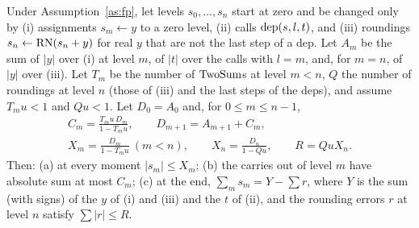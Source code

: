 \begin{lemma}\label{lem:l}
Under Assumption~\ref{as:fp}, let levels $s_0, \dots, s_n$ start at zero and be changed only by (i) assignments $s_m \gets y$ to
a zero level, (ii) calls $\mathrm{dep}(s, l, t)$, and (iii) roundings $s_n \gets \mathrm{RN}(s_n + y)$ for real $y$ that are not the
last step of a dep. Let $A_m$ be the sum of $|y|$ over (i) at level $m$, of $|t|$ over the calls with $l = m$, and, for
$m = n$, of $|y|$ over (iii). Let $T_m$ be the number of $\mathrm{TwoSum}$s at level $m < n$, $Q$ the number of roundings at
level $n$ (those of (iii) and the last steps of the deps), and assume $T_m u < 1$ and $Qu < 1$. Let $D_0 = A_0$ and, for
$0 \le m \le n-1$,
\begin{gather*}
C_m = \frac{T_m u\,D_m}{1 - T_m u}, \qquad D_{m+1} = A_{m+1} + C_m, \\
X_m = \frac{D_m}{1 - T_m u}\ (m < n), \qquad X_n = \frac{D_n}{1 - Qu}, \qquad R = QuX_n.
\end{gather*}
Then: (a) at every moment $|s_m| \le X_m$; (b) the carries out of
level $m$ have absolute sum at most $C_m$; (c) at the end, $\sum_m s_m = Y - \sum r$, where $Y$ is the sum (with signs)
of the $y$ of (i) and (iii) and the $t$ of (ii), and the rounding errors $r$ at level $n$ satisfy $\sum|r| \le R$.
\end{lemma}

